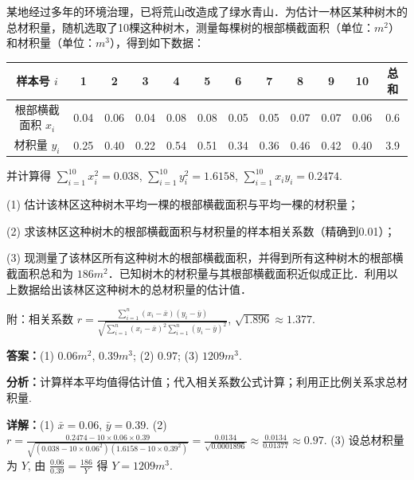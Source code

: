 \begin{question}[points=12]
某地经过多年的环境治理，已将荒山改造成了绿水青山．为估计一林区某种树木的总材积量，随机选取了10棵这种树木，测量每棵树的根部横截面积（单位：$m^2$）和材积量（单位：$m^3$），得到如下数据：

\begin{tabular}{c|cccccccccc|c}

样本号 $i$ & 1 & 2 & 3 & 4 & 5 & 6 & 7 & 8 & 9 & 10 & 总和 \\ \hline

根部横截面积 $x_i$ & 0.04 & 0.06 & 0.04 & 0.08 & 0.08 & 0.05 & 0.05 & 0.07 & 0.07 & 0.06 & 0.6 \\

材积量 $y_i$ & 0.25 & 0.40 & 0.22 & 0.54 & 0.51 & 0.34 & 0.36 & 0.46 & 0.42 & 0.40 & 3.9 \\

\end{tabular}

并计算得 $\sum_{i=1}^{10} x_i^2 = 0.038$, $\sum_{i=1}^{10} y_i^2 = 1.6158$, $\sum_{i=1}^{10} x_i y_i = 0.2474$.

(1) 估计该林区这种树木平均一棵的根部横截面积与平均一棵的材积量；

(2) 求该林区这种树木的根部横截面积与材积量的样本相关系数（精确到0.01）；

(3) 现测量了该林区所有这种树木的根部横截面积，并得到所有这种树木的根部横截面积总和为 $186 m^2$．已知树木的材积量与其根部横截面积近似成正比．利用以上数据给出该林区这种树木的总材积量的估计值．

附：相关系数 $r = \frac{\sum_{i=1}^{n}(x_i-\bar{x})(y_i-\bar{y})}{\sqrt{\sum_{i=1}^{n}(x_i-\bar{x})^2 \sum_{i=1}^{n}(y_i-\bar{y})^2}}$, $\sqrt{1.896}\approx1.377$.
\begin{solution}
\textbf{答案：}(1) $0.06m^2$, $0.39m^3$; (2) $0.97$; (3) $1209m^3$.

\textbf{分析：}计算样本平均值得估计值；代入相关系数公式计算；利用正比例关系求总材积量.

\textbf{详解：}(1) $\bar{x}=0.06$, $\bar{y}=0.39$.
(2) $r = \frac{0.2474-10\times0.06\times0.39}{\sqrt{(0.038-10\times0.06^2)(1.6158-10\times0.39^2)}} = \frac{0.0134}{\sqrt{0.0001896}} \approx \frac{0.0134}{0.01377} \approx 0.97$.
(3) 设总材积量为 $Y$, 由 $\frac{0.06}{0.39}=\frac{186}{Y}$ 得 $Y=1209m^3$.
\end{solution}
\end{question}

